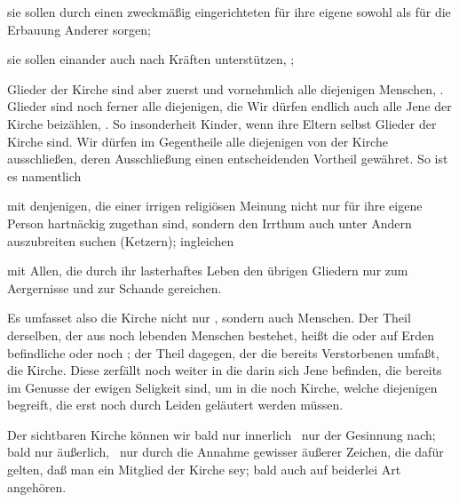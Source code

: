\begin{aufza}
\begin{aufzb}
\item sie sollen durch einen zweckmäßig eingerichteten  für ihre eigene sowohl als für die Erbauung Anderer sorgen;~
\item sie sollen einander auch  nach Kräften unterstützen, \usw ;
\end{aufzb}
\item Glieder der Kirche sind aber zuerst und vornehmlich alle diejenigen Menschen, . Glieder sind noch ferner alle diejenigen, die  Wir dürfen endlich auch alle Jene der Kirche beizählen, . So insonderheit Kinder, wenn ihre Eltern selbst Glieder der Kirche sind. Wir dürfen im Gegentheile alle diejenigen von der Kirche ausschließen, deren Ausschließung einen entscheidenden Vortheil gewähret. So ist es namentlich
\begin{aufzb}
\item mit denjenigen, die einer irrigen religiösen Meinung nicht nur für ihre eigene Person hartnäckig zugethan sind, sondern den Irrthum auch unter Andern auszubreiten suchen (Ketzern); ingleichen
\item mit Allen, die durch ihr lasterhaftes Leben den übrigen Gliedern nur zum Aergernisse und zur Schande gereichen.
\end{aufzb}
\item Es umfasset also die Kirche nicht nur , sondern auch  Menschen. Der Theil derselben, der aus noch lebenden Menschen bestehet, heißt die  oder auf Erden befindliche oder noch ; der Theil dagegen, der die bereits Verstorbenen umfaßt, die  Kirche. Diese zerfällt noch weiter in die  darin sich Jene befinden, die bereits im Genusse der ewigen Seligkeit sind, um in die noch  Kirche, welche diejenigen begreift, die erst noch durch Leiden geläutert werden müssen.
\item Der sichtbaren Kirche können wir bald nur innerlich \dh\  nur der Gesinnung nach; bald nur äußerlich, \dh\  nur durch die Annahme gewisser äußerer Zeichen, die dafür gelten, daß man ein Mitglied der Kirche sey; bald auch auf beiderlei Art angehören.~

\end{aufza}
